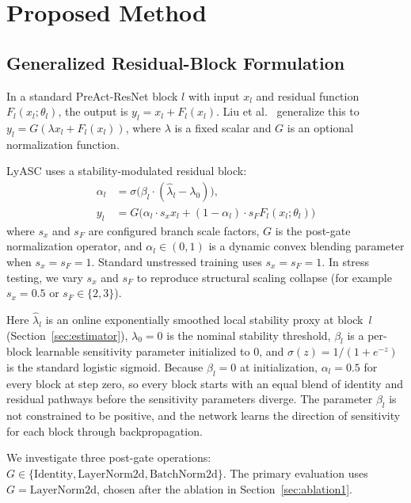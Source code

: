 \documentclass[conference,10pt]{IEEEtran}
\begin{document}
\section{Proposed Method}

\subsection{Generalized Residual-Block Formulation}

In a standard PreAct-ResNet block $l$ with input $x_l$ and residual
function $F_l(x_l; \theta_l)$, the output is $y_l = x_l + F_l(x_l)$. Liu
et al.~\cite{liu2021rethinking} generalize this to
$y_l = G(\lambda x_l + F_l(x_l))$, where $\lambda$ is a fixed scalar
and $G$ is an optional normalization function.

LyASC uses a stability-modulated residual block:
\begin{align}
    \alpha_l &= \sigma\bigl(\beta_l \cdot (\hat{\lambda}_l - \lambda_0)\bigr), \label{eq:gate} \\
    y_l &= G\bigl(\alpha_l \cdot s_x x_l + (1 - \alpha_l) \cdot s_F F_l(x_l; \theta_l)\bigr) \label{eq:output}
\end{align}
where $s_x$ and $s_F$ are configured branch scale factors, $G$ is the
post-gate normalization operator, and $\alpha_l \in (0, 1)$ is a dynamic
convex blending parameter when $s_x = s_F = 1$. Standard unstressed
training uses $s_x = s_F = 1$. In stress testing, we vary $s_x$ and $s_F$
to reproduce structural scaling collapse (for example $s_x=0.5$ or
$s_F \in \{2, 3\}$).

Here $\hat{\lambda}_l$ is an online exponentially smoothed local stability
proxy at block~$l$ (Section~\ref{sec:estimator}), $\lambda_0 = 0$ is the
nominal stability threshold, $\beta_l$ is a per-block learnable sensitivity
parameter initialized to 0, and $\sigma(z) = 1 / (1 + e^{-z})$ is the standard
logistic sigmoid. Because $\beta_l = 0$ at initialization, $\alpha_l = 0.5$ for
every block at step zero, so every block starts with an equal blend of
identity and residual pathways before the sensitivity parameters diverge.
The parameter $\beta_l$ is not constrained to be positive, and the network
learns the direction of sensitivity for each block through backpropagation.

We investigate three post-gate operations: $G \in \{\text{Identity}, \text{LayerNorm2d}, \text{BatchNorm2d}\}$.
The primary evaluation uses $G = \text{LayerNorm2d}$, chosen after the
ablation in Section~\ref{sec:ablation1}.
\end{document}
